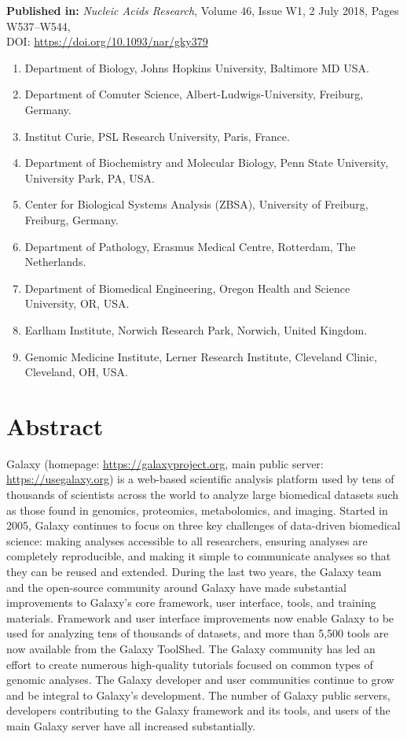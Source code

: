 \textbf{Published in:} \emph{Nucleic Acids Research}, Volume 46, Issue W1, 2 July 2018, Pages W537–W544,  \\
DOI: \url{https://doi.org/10.1093/nar/gky379}

\small
\begin{enumerate}
\itemsep-0.5em
\item Department of Biology, Johns Hopkins University, Baltimore MD USA.\label{affil:hopkins}
\item Department of Comuter Science, Albert-Ludwigs-University, Freiburg, Germany.\label{affil:freiburg}
\item Institut Curie, PSL Research University, Paris, France.\label{affil:curie}
\item Department of Biochemistry and Molecular Biology, Penn State University, University Park, PA, USA.\label{affil:pennstate}
\item Center for Biological Systems Analysis (ZBSA), University of Freiburg, Freiburg, Germany.\label{affil:freiburg2}
\item Department of Pathology, Erasmus Medical Centre, Rotterdam, The Netherlands.\label{affil:emc}
\item Department of Biomedical Engineering, Oregon Health and Science University, OR, USA.\label{affil:oregon}
\item Earlham Institute, Norwich Research Park, Norwich, United Kingdom.\label{affil:earlham}
\item Genomic Medicine Institute, Lerner Research Institute, Cleveland Clinic, Cleveland, OH, USA.\label{affil:cleveland}
\end{enumerate}
\normalsize


\section*{Abstract}
Galaxy (homepage: \url{https://galaxyproject.org}, main public server: \url{https://usegalaxy.org}) is a web-based scientific analysis platform used by tens of thousands of scientists across the world to analyze large biomedical datasets such as those found in genomics, proteomics, metabolomics, and imaging. Started in 2005, Galaxy continues to focus on three key challenges of data-driven biomedical science: making analyses accessible to all researchers, ensuring analyses are completely reproducible, and making it simple to communicate analyses so that they can be reused and extended. During the last two years, the Galaxy team and the open-source community around Galaxy have made substantial improvements to Galaxy’s core framework, user interface, tools, and training materials. Framework and user interface improvements now enable Galaxy to be used for analyzing tens of thousands of datasets, and more than 5,500 tools are now available from the Galaxy ToolShed. The Galaxy community has led an effort to create numerous high-quality tutorials focused on common types of genomic analyses. The Galaxy developer and user communities continue to grow and be integral to Galaxy’s development. The number of Galaxy public servers, developers contributing to the Galaxy framework and its tools, and users of the main Galaxy server have all increased substantially.


